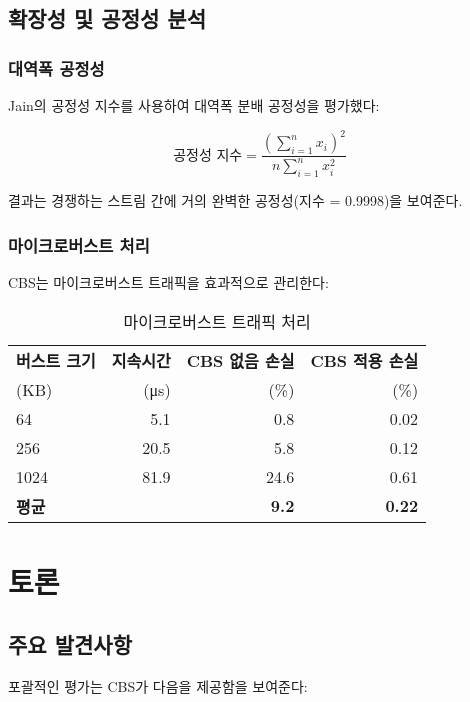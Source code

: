 \documentclass[twocolumn,10pt]{article}
\begin{document}
\subsection{확장성 및 공정성 분석}

\subsubsection{대역폭 공정성}

Jain의 공정성 지수를 사용하여 대역폭 분배 공정성을 평가했다:

\begin{equation}
\text{공정성 지수} = \frac{(\sum_{i=1}^{n} x_i)^2}{n \sum_{i=1}^{n} x_i^2}
\end{equation}

결과는 경쟁하는 스트림 간에 거의 완벽한 공정성(지수 = 0.9998)을 보여준다.

\subsubsection{마이크로버스트 처리}

CBS는 마이크로버스트 트래픽을 효과적으로 관리한다:

\begin{table}[h]
\centering
\caption{마이크로버스트 트래픽 처리}
\label{tab:microburst}
\begin{tabular}{lrrr}
\toprule
\textbf{버스트 크기} & \textbf{지속시간} & \textbf{CBS 없음 손실} & \textbf{CBS 적용 손실} \\
(KB) & (μs) & (\%) & (\%) \\
\midrule
64 & 5.1 & 0.8 & 0.02 \\
256 & 20.5 & 5.8 & 0.12 \\
1024 & 81.9 & 24.6 & 0.61 \\
\midrule
\textbf{평균} & & \textbf{9.2} & \textbf{0.22} \\
\bottomrule
\end{tabular}
\end{table}

\section{토론}

\subsection{주요 발견사항}

포괄적인 평가는 CBS가 다음을 제공함을 보여준다:
\end{document}

